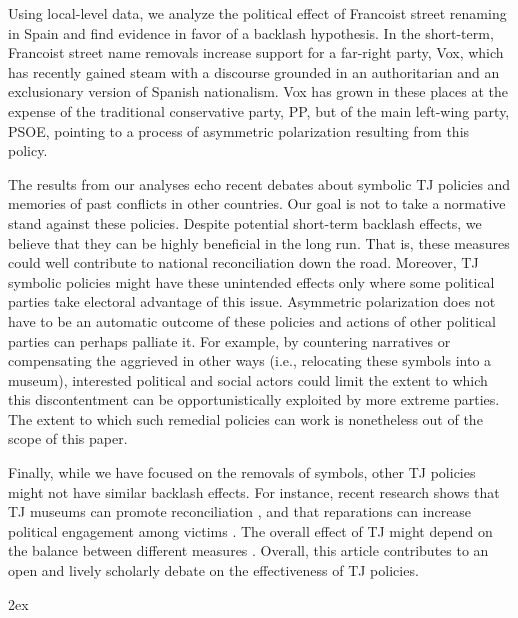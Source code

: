 \documentclass[12pt, titlepage]{article}
\begin{document}
Using local-level data, we analyze the political effect of Francoist street renaming in Spain and find evidence in favor of a backlash hypothesis. In the short-term, Francoist street name removals increase support for a far-right party, Vox, which has recently gained steam with a discourse grounded in an authoritarian and an exclusionary version of Spanish nationalism. Vox has grown in these places at the expense of the traditional conservative party, PP, but of the main left-wing party, PSOE, pointing to a process of asymmetric polarization resulting from this policy.

The results from our analyses echo recent debates about symbolic TJ policies and memories of past conflicts in other countries. Our goal is not to take a normative stand against these policies. Despite potential short-term backlash effects, we believe that they can be highly beneficial in the long run. That is, these measures could well contribute to national reconciliation down the road. Moreover, TJ symbolic policies might have these unintended effects only where some political parties take electoral advantage of this issue. Asymmetric polarization does not have to be an automatic outcome of these policies and actions of other political parties can perhaps palliate it. For example, by countering narratives or compensating the aggrieved in other ways (i.e., relocating these symbols into a museum), interested political and social actors could limit the extent to which this discontentment can be opportunistically exploited by more extreme parties. The extent to which such remedial policies can work is nonetheless out of the scope of this paper.

Finally, while we have focused on the removals of symbols, other TJ policies might not have similar backlash effects. For instance, recent research shows that TJ museums can promote reconciliation \citep{Balcells:2020aa}, and that reparations can increase political engagement among victims \citep{voytas:2021}. The overall effect of TJ might depend on the balance between different measures \citep{Olsen:2010aa, Loyle:2017aa}.
Overall, this article contributes to an open and lively scholarly debate on the effectiveness of TJ policies.

\newpage
\begingroup
\parindent 0pt
\parskip 2ex
\def\enotesize{\normalsize}
\theendnotes
\endgroup

\clearpage



%
\end{document}
